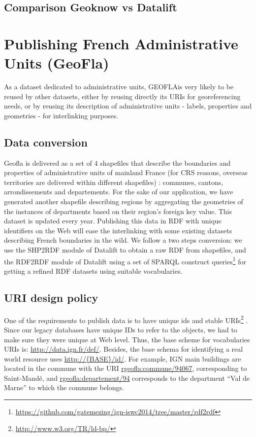 \begin{itemize}
\subsection{Comparison Geoknow vs Datalift}


\section{Publishing French Administrative Units (GeoFla)} \label{sec:geofla}
As a dataset dedicated to administrative units, GEOFLA\circledR is very likely to be reused by other datasets, either by reusing directly its URIs for georeferencing needs, or by reusing its description of administrative units - labels, properties and geometries - for interlinking purposes. 

\subsection{Data conversion}
\label{sec:dconversion}
Geofla  is delivered as a set of 4 shapefiles  that describe the boundaries and properties of administrative units of mainland France (for CRS reasons, overseas territories are delivered within different shapefiles) : communes, cantons, arrondissements and departements. For the sake of our application, we have generated another shapefile describing regions by aggregating the geometries of the instances of departments based on their region's foreign key value. This  dataset is updated every year.  Publishing this data in RDF with unique identifiers on the Web will ease the interlinking with some existing datasets describing French boundaries in the wild. We follow a two steps conversion: we use the SHP2RDF module of Datalift to obtain a raw RDF from shapefiles, and the RDF2RDF module of Datalift  using a set of SPARQL construct queries\footnote{ \url{https://github.com/gatemezing/ign-iswc2014/tree/master/rdf2rdf}} for getting a refined RDF datasets using suitable vocabularies.

\subsection{URI design policy} \label{sec:urigeofla}

One of the requirements to publish data is to have unique ids and stable URIs\footnote{\url{http://www.w3.org/TR/ld-bp/}} . Since our legacy databases have unique IDs to refer to the objects, we had to make sure they were unique at Web level. Thus, the base scheme for vocabularies URIs is: \url{http://data.ign.fr/def/}. Besides, the base schema for identifying a real world resource uses \url{http://{BASE}/id/}. For example, IGN main buildings  are located in the commune with the URI \url{rgeofla:commune/94067}, corresponding to Saint-Mand\'{e}, and \url{rgeofla:departement/94} corresponds to the department ``Val de Marne'' to which the commune belongs.


\end{itemize}
